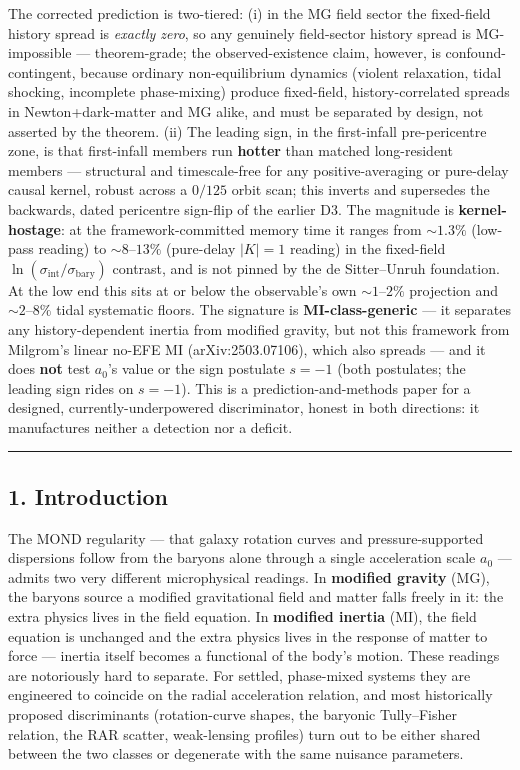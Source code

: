 \documentclass[
]{article}
\begin{document}
The corrected prediction is two-tiered: (i) in the MG field sector the
fixed-field history spread is \emph{exactly zero}, so any genuinely
field-sector history spread is MG-impossible --- theorem-grade; the
observed-existence claim, however, is confound-contingent, because
ordinary non-equilibrium dynamics (violent relaxation, tidal shocking,
incomplete phase-mixing) produce fixed-field, history-correlated spreads
in Newton+dark-matter and MG alike, and must be separated by design, not
asserted by the theorem. (ii) The leading sign, in the first-infall
pre-pericentre zone, is that first-infall members run \textbf{hotter}
than matched long-resident members --- structural and timescale-free for
any positive-averaging or pure-delay causal kernel, robust across a
\(0/125\) orbit scan; this inverts and supersedes the backwards, dated
pericentre sign-flip of the earlier D3. The magnitude is
\textbf{kernel-hostage}: at the framework-committed memory time it
ranges from \(\sim1.3\%\) (low-pass reading) to \(\sim8\)--\(13\%\)
(pure-delay \(|K|=1\) reading) in the fixed-field
\(\ln(\sigma_\mathrm{int}/\sigma_\mathrm{bary})\) contrast, and is not pinned
by the de Sitter--Unruh foundation. At the low end this sits at or below
the observable's own \(\sim1\)--\(2\%\) projection and
\(\sim2\)--\(8\%\) tidal systematic floors. The signature is
\textbf{MI-class-generic} --- it separates any history-dependent inertia
from modified gravity, but not this framework from Milgrom's linear
no-EFE MI (arXiv:2503.07106), which also spreads --- and it does
\textbf{not} test \(a_0\)'s value or the sign postulate \(s=-1\) (both
postulates; the leading sign rides on \(s=-1\)). This is a
prediction-and-methods paper for a designed, currently-underpowered
discriminator, honest in both directions: it manufactures neither a
detection nor a deficit.

\begin{center}\rule{0.5\linewidth}{0.5pt}\end{center}

\subsection{1. Introduction}\label{introduction}

The MOND regularity --- that galaxy rotation curves and
pressure-supported dispersions follow from the baryons alone through a
single acceleration scale \(a_0\) --- admits two very different
microphysical readings. In \textbf{modified gravity} (MG), the baryons
source a modified gravitational field and matter falls freely in it: the
extra physics lives in the field equation. In \textbf{modified inertia}
(MI), the field equation is unchanged and the extra physics lives in the
response of matter to force --- inertia itself becomes a functional of
the body's motion. These readings are notoriously hard to separate. For
settled, phase-mixed systems they are engineered to coincide on the
radial acceleration relation, and most historically proposed
discriminants (rotation-curve shapes, the baryonic Tully--Fisher
relation, the RAR scatter, weak-lensing profiles) turn out to be either
shared between the two classes or degenerate with the same nuisance
parameters.
\end{document}
